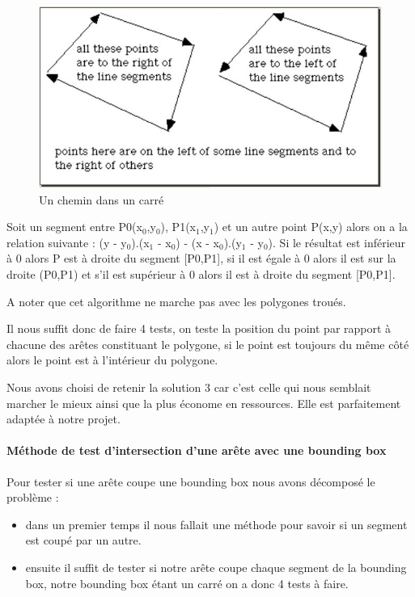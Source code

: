 \documentclass[a4paper,12pt]{report}
\begin{document}
\begin{figure}[h]
\centering
\includegraphics[scale=0.6]{Images/chemin.jpg}
\caption{Un chemin dans un carré}
\end{figure}
\vspace{0.5cm}

Soit un segment entre P0(x$_{0}$,y$_{0}$), P1(x$_{1}$,y$_{1}$) et un autre point P(x,y) alors on a la relation suivante : (y - y$_{0}$).(x$_{1}$ - x$_{0}$) - (x - x$_{0}$).(y$_{1}$ - y$_{0}$).
Si le résultat est inférieur à 0 alors P est à droite du segment [P0,P1], si il est égale à 0 alors il est sur la droite (P0,P1) et s'il est supérieur à 0 alors il est à droite du segment [P0,P1].

A noter que cet algorithme ne marche pas avec les polygones troués. 

Il nous suffit donc de faire 4 tests, on teste la position du point par rapport à chacune des arêtes constituant le polygone, si le point est toujours du même côté alors le point est à l'intérieur du polygone.

Nous avons choisi de retenir la solution 3 car c'est celle qui nous semblait marcher le mieux ainsi que la plus économe en ressources. Elle est parfaitement adaptée à notre projet.

\paragraph{Méthode de test d'intersection d'une arête avec une bounding box }


Pour tester si une arête coupe une bounding box nous avons décomposé le problème :
\begin{itemize}
 \item dans un premier temps il nous fallait une méthode pour savoir si un segment est coupé par un autre.
 \item ensuite il suffit de tester si notre arête coupe chaque segment de la bounding box, notre bounding box étant un carré on a donc 4 tests à faire.
\end{itemize}
\end{document}
